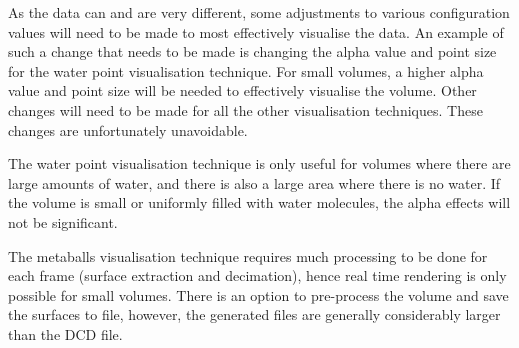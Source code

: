 As the data can and are very different, some adjustments to various
configuration values will need to be made to most effectively visualise the
data. An example of such a change that needs to be made is changing the alpha
value and point size for the water point visualisation technique. For small
volumes, a higher alpha value and point size will be needed to effectively
visualise the volume. Other changes will need to be made for all the other
visualisation techniques. These changes are unfortunately unavoidable.

The water point visualisation technique is only useful for volumes where there
are large amounts of water, and there is also a large area where there is no
water. If the volume is small or uniformly filled with water molecules, the
alpha effects will not be significant.

The metaballs visualisation technique requires much processing to be done for
each frame (surface extraction and decimation), hence real time rendering is
only possible for small volumes. There is an option to pre-process the volume
and save the surfaces to file, however, the generated files are generally
considerably larger than the DCD file.



